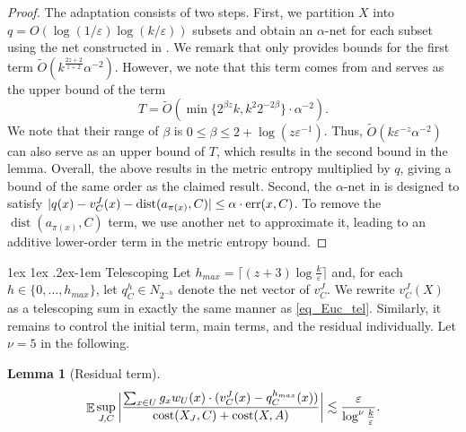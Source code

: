 \documentclass[11pt,letterpaper]{article}
\makeatletter
\renewcommand{\paragraph}{%
  \@startsection{paragraph}{4}%
  {\z@}{1ex \@plus 1ex \@minus .2ex}{-1em}%
  {\normalfont\normalsize\bfseries}%
}
\newtheorem{lemma}[theorem]{Lemma}
\theoremstyle{definition}
\newcommand{\eps}{\varepsilon}
\DeclareMathOperator*{\E}{\ensuremath{\mathbb{E}}}
\DeclareMathOperator{\dist}{dist}
\DeclarePairedDelimiter{\abs}{\lvert}{\rvert}
\makeatother
\begin{document}
\begin{proof}
The adaptation consists of two steps. First, we partition $X$ into $q = O(\log(1/\eps)\log(k/\eps))$ subsets and obtain an $\alpha$-net for each subset using the net constructed in \cite[Lemma B.2]{huang2024optimal}. 
%
We remark that \cite[Lemma B.2]{huang2024optimal} only provides bounds for the first term $\tilde{O}(k^\frac{2z+2}{z+2} \alpha^{-2})$.
%
However, we note that this term comes from \cite[Lemma B.11]{huang2024optimal} and serves as the upper bound of the term
\[
T = \tilde{O}(\min\{ 2^{\beta z} k, k^2 2^{-2\beta} \} \cdot \alpha^{-2}).
\]
%
We note that their range of $\beta$ is $0\leq \beta \leq 2 + \log (z \eps^{-1})$.
%
Thus, $\tilde{O} ( k\eps^{-z} \alpha^{-2})$ can also serve as an upper bound of $T$, which results in the second bound in the lemma.
%
Overall, the above results in the metric entropy multiplied by $q$, giving a bound of the same order as the claimed result. 
%
Second, the $\alpha$-net in \cite{huang2024optimal} is designed to satisfy $\abs{q(x) - v_C^J(x) - \dist(a_{\pi(x)},C)} \leq \alpha\cdot \operatorname{err}(x,C)$. To remove the $\dist(a_{\pi(x)},C)$ term, we use another net to approximate it, leading to an additive lower-order term in the metric entropy bound.
\end{proof}

\paragraph{Telescoping} Let $h_{max}=\lceil (z+3)\log \frac{k}{\eps}\rceil$ and, for each $h\in \{0,\dots,h_{max}\}$, let $q_C^h\in N_{2^{-h}}$ denote the net vector of $v_C^J$. We rewrite $v_C^J(X)$ as a telescoping sum in exactly the same manner as \eqref{eq_Euc_tel}.
%
Similarly, it remains to control the initial term, main terms, and the residual individually. Let $\nu=5$ in the following.


\begin{lemma}[Residual term]
\begin{eqnarray*}
\E\sup_{J,C}\bigg|\frac{\sum_{x\in U} g_x w_U(x)\cdot (v_C^J(x)-q_C^{h_{max}}(x))}{\cost(X_J,C)+\cost(X,A)}\bigg|\lesssim \frac{\eps}{\log^\nu \frac{k}{\eps}}.
\end{eqnarray*}
\end{lemma}
\end{document}
